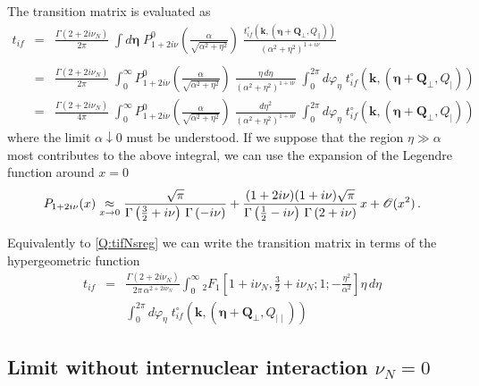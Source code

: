 The transition matrix is evaluated as
\begin{eqnarray}\label{Q:tifNsreg}
t_{if} &=&   \frac{\Gamma \left( 2 + 2 i \nu_{N} \right)}{2 \pi} \;
\int d \bm{\eta} \; P^{0}_{1 + 2 i \nu} \left(
\frac{\alpha}{\sqrt{\alpha^{2}+ \eta^{2}}}\right) \;
\frac{t^{\circ}_{if}(\bm{k},(\bm{\eta}+\bm{Q}_{\perp},Q_{\parallel}))} {
\left( {\alpha^{2} + \eta^{2}} \right)^{1+i \nu}} \nonumber \\ \\
&=&  \frac{\Gamma \left( 2 + 2 i \nu_{N} \right)}{2 \pi} \;
\int_{0}^{\infty} P^{0}_{1 + 2 i \nu} \left(
\frac{\alpha}{\sqrt{\alpha^{2}+ \eta^{2}}} \right) \; \frac{\eta \,
d \eta}{\left( {\alpha^{2} + \eta^{2}} \right)^{1+i \nu}}
\;\int_{0}^{2 \pi} d \varphi_{\eta} \;
t^{\circ}_{if}(\bm{k},(\bm{\eta}+\bm{Q}_{\perp},Q_{\mid }))\nonumber
\\
&=&  \frac{\Gamma \left( 2 + 2 i \nu_{N} \right)}{4 \pi} \;
\int_{0}^{\infty} P^{0}_{1 + 2 i \nu} \left(
\frac{\alpha}{\sqrt{\alpha^{2}+ \eta^{2}}} \right) \; \frac{d
\eta^{2}}{ \left( {\alpha^{2} + \eta^{2}} \right)^{1+i \nu}}
\;\int_{0}^{2 \pi} d \varphi_{\eta} \;
t^{\circ}_{if}(\bm{k},(\bm{\eta}+\bm{Q}_{\perp},Q_{\mid }))\nonumber
\end{eqnarray}
%
where the limit $\alpha \downarrow 0$ must be understood. If we suppose
that the region $\eta \gg \alpha $ most contributes to the above
integral, we can use the expansion of the Legendre function around
$x=0$
%
\[
P_{1 + 2 i \nu} (x) \mathrel{\mathop{\kern0pt\approx}\limits_{x \to 0}}
\frac{\sqrt{\pi}}{\Gamma\left(\frac{3}{2} + i \nu \right) \,
\Gamma\left(-i \nu\right)} + \frac{(1 + 2 i \nu) (1 + i \nu)
\sqrt{\pi}}{\Gamma\left(\frac{1}{2} - i \nu \right) \,
\Gamma\left(2+ i \nu \right)}\, x + \mathcal{O}(x^{2}) \, .
\]


Equivalently to \ref{Q:tifNsreg} we can write the transition matrix in
terms of the hypergeometric function
%
\begin{eqnarray}\label{Q:t_if-Nint-hyperg}
t_{if} & =&\frac{\Gamma \left( 2 + 2 i \nu_{N} \right)}{2 \pi \,
\alpha^{2 + 2 i \nu_{N}}} \int_{0}^{\infty} {_{2}F_{1}}\left[ 1 +
i \nu_{N}, \frac{3}{2} + i \nu_{N} ; 1; -
\frac{\eta^{2}}{\alpha^{2}} \right] \eta \, d \eta \nonumber
\\
&&\int_{0}^{2 \pi} d \varphi_{\eta} \;
t^{\circ}_{if}(\bm{k},(\bm{\eta}+\bm{Q}_{\perp},Q_{\mid  \mid }))
\end{eqnarray}

\subsection*{Limit without internuclear interaction $\nu_{N}=0$}

